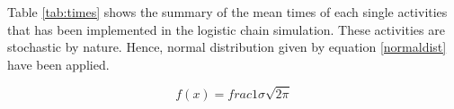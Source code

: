 Table \ref{tab:times} shows the summary of the mean times of each single activities that has been implemented in the logistic chain simulation. These activities are stochastic by nature. Hence, normal distribution given by equation \ref{normaldist} have been applied.

\begin{equation}
\label{eqn:normaldist}
f\left( x \right) = frac{1}{\sigma \sqrt{2 \pi} }
\end{equation}